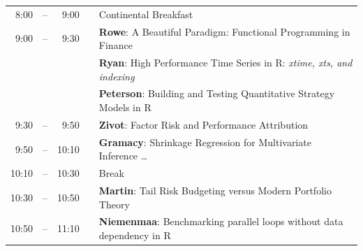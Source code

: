 \documentclass[10pt]{article}
\newcommand{\mylinecolor}[1]{\color{#1}\vspace{-8pt}}  %
\begin{document}
\begin{tabular}{rlrlp{5in}}
  8:00  & -- &  9:00 &   & \small{\mylinecolor{Breaks} Continental Breakfast}  \\
   9:00 & -- &  9:30 &   & \textbf{\color{LightningTalk} Rowe}: \small{A Beautiful Paradigm: Functional Programming in Finance} \\
          &    &         &   & \textbf{\color{LightningTalk} Ryan}: \small{High Performance Time Series in R: \emph{xtime, xts, and indexing}} \\
          &    &         &   & \textbf{\color{LightningTalk} Peterson}: \small{Building and Testing Quantitative Strategy Models in R} \\
  9:30  & -- &  9:50 &   & \textbf{\color{Talk} Zivot}: \small{Factor Risk and Performance Attribution} \\
  9:50  & -- &  10:10 &   & \textbf{\color{Talk} Gramacy}: \small{Shrinkage Regression for Multivariate Inference \ldots} \\ %
  10:10 & -- & 10:30 &   & \small{\mylinecolor{Breaks}  Break}  \\
  10:30  & -- &  10:50 &   & \textbf{\color{Talk} Martin}: \small{Tail Risk Budgeting versus Modern Portfolio Theory} \\
  10:50  & -- &  11:10 &   & \textbf{\color{Talk} Niemenmaa}: \small{Benchmarking parallel loops without data dependency in R} \\

\end{tabular}
\end{document}
